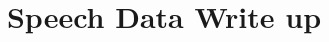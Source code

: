 \documentclass [12pt,letterpaper]{report}
\title{Speech Data Write up}
\author{}
\begin{document}

\nocite{*}
%
%
\end{document}
